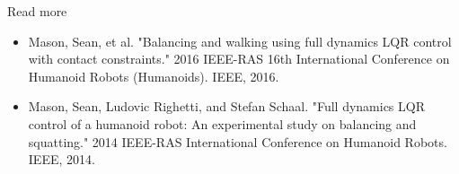 \documentclass{beamer}
\begin{document}
\begin{frame}{Read more}
	
	\begin{itemize}
		
		\item Mason, Sean, et al. "Balancing and walking using full dynamics LQR control with contact constraints." 2016 IEEE-RAS 16th International Conference on Humanoid Robots (Humanoids). IEEE, 2016. 
		
		\item Mason, Sean, Ludovic Righetti, and Stefan Schaal. "Full dynamics LQR control of a humanoid robot: An experimental study on balancing and squatting." 2014 IEEE-RAS International Conference on Humanoid Robots. IEEE, 2014. 
		 
		
	\end{itemize}
	
\end{frame}



\myqrframe
\end{document}
